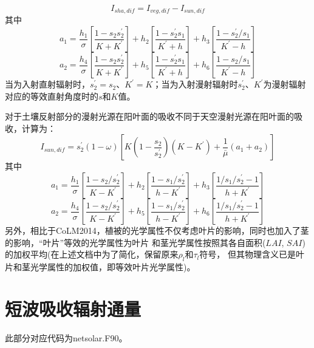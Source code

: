\begin{equation}
I_{sha,dif}=I_{veg,dif}-I_{sun,dif}
\end{equation}
其中
\begin{equation}
a_{1}=\frac{h_{1}}{\sigma}\left[\frac{1-s_{2} s_{2}^{\prime}}{K+K^{\prime}}\right]+h_{2}\left[\frac{1-s_{2}^{\prime} 
s_{1}}{K^{\prime}+h}\right]+h_{3}\left[\frac{1-s_{2}^{\prime} / s_{1}}{K^{\prime}-h}\right]
\end{equation}
\begin{equation}
a_{2}=\frac{h_{4}}{\sigma}\left[\frac{1-s_{2} s_{2}^{\prime}}{K+K^{\prime}}\right]+h_{5}\left[\frac{1-s_{2}^{\prime} s_{1}}
{K^{\prime}+h}\right]+h_{6}\left[\frac{1-s_{2} / s_{1}}{K^{\prime}-h}\right]
\end{equation}
当为入射直射辐射时，$s_2^\prime=s_2$、$K^\prime=K$；当为入射漫射辐射时$s_2^\prime$、$K^\prime$为漫射辐射对应的等效直射角度时的$s$和$K$值。


对于土壤反射部分的漫射光源在阳叶面的吸收不同于天空漫射光源在阳叶面的吸收，计算为：
\begin{equation}
I_{s u n, dif}=s_{2}^{\prime}(1-\omega)\left[K\left(1-\frac{s_{2}}{s_{2}^{\prime}}\right)
\left(K-K^{\prime}\right)+\frac{1}{\bar{\mu}}\left(a_{1}+a_{2}\right)\right]
\end{equation}
其中
\begin{equation}
a_{1}=\frac{h_{1}}{\sigma}\left[\frac{1-s_{2} / s_{2}^{\prime}}{K-K^{\prime}}\right]+h_{2}\left[\frac{1-s_{1} /
 s_{2}^{\prime}}{h-K^{\prime}}\right]+h_{3}\left[\frac{1 / s_{1} / s_{2}^{\prime}-1}{h+K^{\prime}}\right]
\end{equation}
\begin{equation}
a_{2}=\frac{h_{4}}{\sigma}\left[\frac{1-s_{2} / s_{2}^{\prime}}{K-K^{\prime}}\right]+h_{5}\left[\frac{1-s_{1} / 
s_{2}^{\prime}}{h-K^{\prime}}\right]+h_{6}\left[\frac{1 / s_{1} / s_{2}^{\prime}-1}{h+K^{\prime}}\right]
\end{equation}
另外，相比于CoLM2014，植被的光学属性不仅考虑叶片的影响，同时也加入了茎的影响，“叶片”等效的光学属性为叶片
和茎光学属性按照其各自面积($LAI$, $SAI$)的加权平均(在上述文档中为了简化，保留原来$\rho_l$和$\tau_l$符号，
但其物理含义已是叶片和茎光学属性的加权值，即等效叶片光学属性)。



\section{短波吸收辐射通量}\label{短波吸收辐射通量}
此部分对应代码为netsolar.F90。

